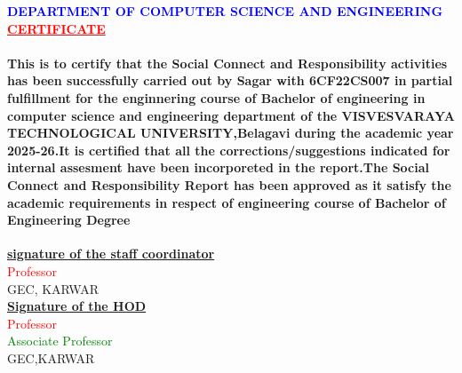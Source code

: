 \usepackage{graphicx}
\usepackage{xcolor}

\textcolor{blue}{\textbf{DEPARTMENT OF COMPUTER SCIENCE AND ENGINEERING}}\\
\vspace{5mm}
\centering
\textcolor{red}{\underline{\textbf{CERTIFICATE}}}\\
\paragraph{
This is to certify that the Social Connect and Responsibility activities has been
successfully carried out by Sagar with 6CF22CS007 in partial fulfillment for the
enginnering course of Bachelor of engineering in computer science and engineering
department of the VISVESVARAYA TECHNOLOGICAL UNIVERSITY,Belagavi during the
academic year 2025-26.It is certified that all the corrections/suggestions indicated
for internal assesment have been incorporeted in the report.The Social Connect and
Responsibility Report has been approved as it satisfy the academic requirements in
respect of engineering course of Bachelor of Engineering Degree}
\begin{center}
\centering
\vspace{5mm}
\underline{\textbf{signature of the staff coordinator}}\\
\vspace{10mm}
\textcolor{red}{Professor}\\
GEC, KARWAR\\
\vspace{12mm}
\centering
\underline{\textbf{Signature of the HOD}}\\
\vspace{10mm}
\textcolor{red}{Professor}\\
\textcolor{green}{Associate Professor}\\
GEC,KARWAR
\end{center}
